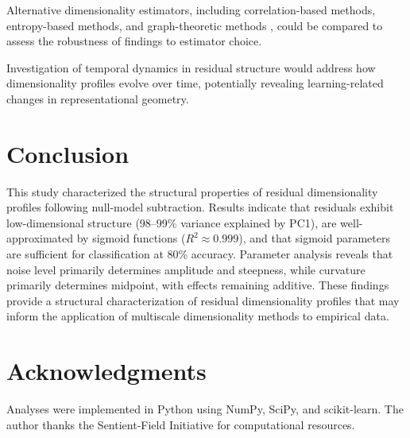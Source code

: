Alternative dimensionality estimators, including correlation-based methods, entropy-based methods, and graph-theoretic methods \citep{penzel2022spectral}, could be compared to assess the robustness of findings to estimator choice.

Investigation of temporal dynamics in residual structure would address how dimensionality profiles evolve over time, potentially revealing learning-related changes in representational geometry.

\section{Conclusion}

This study characterized the structural properties of residual dimensionality profiles following null-model subtraction. Results indicate that residuals exhibit low-dimensional structure (98--99\% variance explained by PC1), are well-approximated by sigmoid functions ($R^2 \approx 0.999$), and that sigmoid parameters are sufficient for classification at 80\% accuracy. Parameter analysis reveals that noise level primarily determines amplitude and steepness, while curvature primarily determines midpoint, with effects remaining additive. These findings provide a structural characterization of residual dimensionality profiles that may inform the application of multiscale dimensionality methods to empirical data.

\section*{Acknowledgments}

Analyses were implemented in Python using NumPy, SciPy, and scikit-learn. The author thanks the Sentient-Field Initiative for computational resources.

